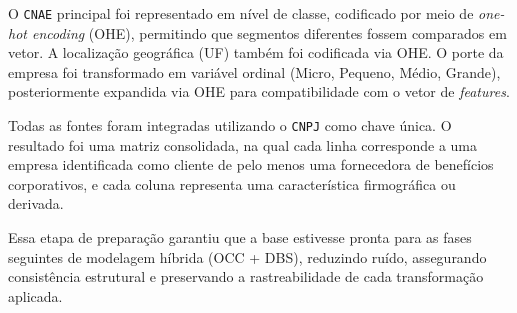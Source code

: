 O \texttt{CNAE} principal foi representado em nível de classe, codificado por meio de \textit{one-hot encoding} (OHE), permitindo que segmentos diferentes fossem comparados em vetor. A localização geográfica (UF) também foi codificada via OHE. O porte da empresa foi transformado em variável ordinal (Micro, Pequeno, Médio, Grande), posteriormente expandida via OHE para compatibilidade com o vetor de \textit{features}.

Todas as fontes foram integradas utilizando o \texttt{CNPJ} como chave única. O resultado foi uma matriz consolidada, na qual cada linha corresponde a uma empresa identificada como cliente de pelo menos uma fornecedora de benefícios corporativos, e cada coluna representa uma característica firmográfica ou derivada.

Essa etapa de preparação garantiu que a base estivesse pronta para as fases seguintes de modelagem híbrida (OCC + DBS), reduzindo ruído, assegurando consistência estrutural e preservando a rastreabilidade de cada transformação aplicada.